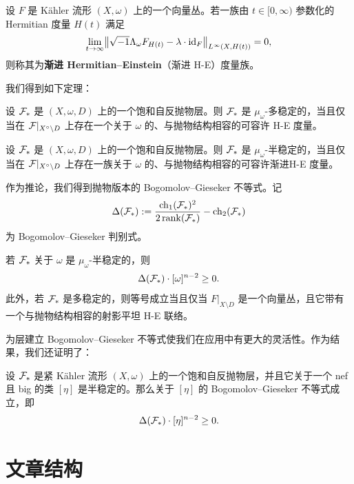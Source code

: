 \begin{definition}
设 \(F\) 是 Kähler 流形 \((X,\omega)\) 上的一个向量丛。若一族由 \(t\in[0,\infty)\) 参数化的 Hermitian 度量 \(H(t)\) 满足
\[
\lim_{t\to\infty}\bigl\|\sqrt{-1}\Lambda_\omega F_{H(t)}-\lambda\cdot \mathrm{id}_F\bigr\|_{L^\infty(X,H(t))}=0,
\]
则称其为\textbf{渐进 Hermitian--Einstein}（渐进 H-E）度量族。
\end{definition}

我们得到如下定理：

\begin{theorem}[定理 6.14]
设 \(\mathcal{F}_{*}\) 是 \((X,\omega,D)\) 上的一个饱和自反抛物层。则 \(\mathcal{F}_{*}\) 是 \(\mu_\omega\)-多稳定的，当且仅当在 \(\mathcal{F}|_{X^\circ\setminus D}\) 上存在一个关于 \(\omega\) 的、与抛物结构相容的可容许 H-E 度量。
\end{theorem}

\begin{theorem}[定理 6.15]
设 \(\mathcal{F}_{*}\) 是 \((X,\omega,D)\) 上的一个饱和自反抛物层。则 \(\mathcal{F}_{*}\) 是 \(\mu_\omega\)-半稳定的，当且仅当在 \(\mathcal{F}|_{X^\circ\setminus D}\) 上存在一族关于 \(\omega\) 的、与抛物结构相容的可容许渐进H-E 度量。
\end{theorem}

作为推论，我们得到抛物版本的 Bogomolov--Gieseker 不等式。记
\[
\Delta(\mathcal{F}_{*}):=\frac{\operatorname{ch}_1(\mathcal{F}_{*})^2}{2\operatorname{rank}(\mathcal{F}_{*})}-\operatorname{ch}_2(\mathcal{F}_{*})
\]
为 Bogomolov--Gieseker 判别式。

\begin{corollary}[推论 6.16]
若 \(\mathcal{F}_{*}\) 关于 \(\omega\) 是 \(\mu_\omega\)-半稳定的，则
\[
\Delta(\mathcal{F}_{*})\cdot [\omega]^{n-2}\ge 0.
\]
此外，若 \(\mathcal{F}_{*}\) 是多稳定的，则等号成立当且仅当 \(F|_{X\setminus D}\) 是一个向量丛，且它带有一个与抛物结构相容的射影平坦 H-E 联络。
\end{corollary}

为层建立 Bogomolov--Gieseker 不等式使我们在应用中有更大的灵活性。作为结果，我们还证明了：

\begin{theorem}[定理 7.1]
设 \(\mathcal{F}_{*}\) 是紧 Kähler 流形 \((X,\omega)\) 上的一个饱和自反抛物层，并且它关于一个 nef 且 big 的类 \([\eta]\) 是半稳定的。那么关于 \([\eta]\) 的 Bogomolov--Gieseker 不等式成立，即
\[
\Delta(\mathcal{F}_{*})\cdot [\eta]^{n-2}\ge 0.
\]
\end{theorem}

\section{文章结构}

